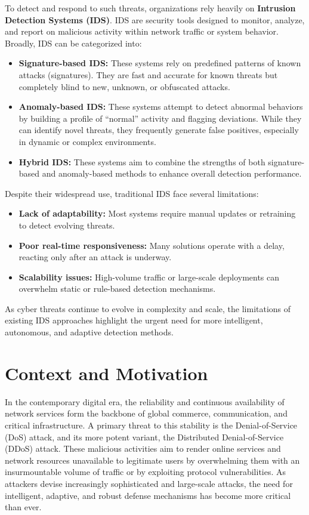 \documentclass[12pt]{report}
\begin{document}
To detect and respond to such threats, organizations rely heavily on \textbf{Intrusion Detection Systems (IDS)}. IDS are security tools designed to monitor, analyze, and report on malicious activity within network traffic or system behavior. Broadly, IDS can be categorized into:

\begin{itemize}
    \item \textbf{Signature-based IDS:} These systems rely on predefined patterns of known attacks (signatures). They are fast and accurate for known threats but completely blind to new, unknown, or obfuscated attacks.

    \item \textbf{Anomaly-based IDS:} These systems attempt to detect abnormal behaviors by building a profile of ``normal'' activity and flagging deviations. While they can identify novel threats, they frequently generate false positives, especially in dynamic or complex environments.

    \item \textbf{Hybrid IDS:} These systems aim to combine the strengths of both signature-based and anomaly-based methods to enhance overall detection performance.
\end{itemize}

Despite their widespread use, traditional IDS face several limitations:

\begin{itemize}
    \item \textbf{Lack of adaptability:} Most systems require manual updates or retraining to detect evolving threats.

    \item \textbf{Poor real-time responsiveness:} Many solutions operate with a delay, reacting only after an attack is underway.

    \item \textbf{Scalability issues:} High-volume traffic or large-scale deployments can overwhelm static or rule-based detection mechanisms.
\end{itemize}

As cyber threats continue to evolve in complexity and scale, the limitations of existing IDS approaches highlight the urgent need for more intelligent, autonomous, and adaptive detection methods.


\section*{Context and Motivation}
In the contemporary digital era, the reliability and continuous availability of network services form the backbone of global commerce, communication, and critical infrastructure. A primary threat to this stability is the Denial-of-Service (DoS) attack, and its more potent variant, the Distributed Denial-of-Service (DDoS) attack. These malicious activities aim to render online services and network resources unavailable to legitimate users by overwhelming them with an insurmountable volume of traffic or by exploiting protocol vulnerabilities. As attackers devise increasingly sophisticated and large-scale attacks, the need for intelligent, adaptive, and robust defense mechanisms has become more critical than ever.
\end{document}
